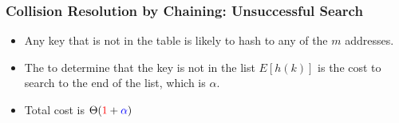 \documentclass[UTF8,11pt]{beamer}
\begin{document}
\begin{frame}
\frametitle{Collision Resolution by Chaining: Unsuccessful Search}

\begin{block}{}
	\begin{center}
		\pause
		
	
	\pause	
	
	\begin{itemize}
		\pause
		\item Any key that is not in the table is \textbf{} likely to hash to any of the $m$ addresses. 
		\pause
		\item The \textbf{} to determine that the key is not in the list $E[h(k)]$ is the cost to search to the end of the list, which is $\alpha$.
		\pause
		\item Total cost is {$\Theta(\textcolor{red}{1}+{\color{blue}\alpha})$}
	\end{itemize}
	\end{center}
\end{block}
\begin{center}
\end{center}
\end{frame}
\end{document}
